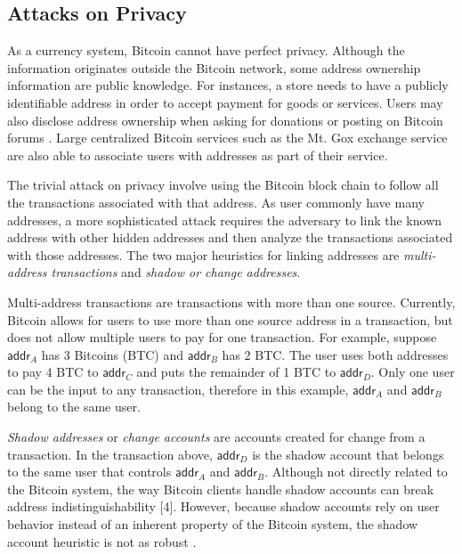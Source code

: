 \subsection{Attacks on Privacy}
As a currency system, Bitcoin cannot have perfect privacy. Although the information originates outside the Bitcoin network, some address ownership information are public knowledge. For instances, a store needs to have a publicly identifiable address in order to accept payment for goods or services.  Users may also disclose address ownership when asking for donations or posting on Bitcoin forums \cite{Fistful12}. Large centralized Bitcoin services such as the Mt. Gox exchange service are also able to associate users with addresses as part of their service.

The trivial attack on privacy involve using the Bitcoin block chain to follow all the transactions associated with that address. As user commonly have many addresses, a more sophisticated attack requires the adversary to link the known address with other hidden addresses and then analyze the transactions associated with those addresses. The two major heuristics for linking addresses are \emph{multi-address transactions} and \emph{shadow or change addresses}. 

Multi-address transactions are transactions with more than one source. Currently, Bitcoin allows for users to use more than one source address in a transaction, but does not allow multiple users to pay for one transaction. For example, suppose $\mathsf{addr}_A$ has 3 Bitcoins (BTC) and $\mathsf{addr}_B$ has 2 BTC. The user uses both addresses to pay 4 BTC to $\mathsf{addr}_C$ and puts the remainder of 1 BTC to $\mathsf{addr}_D$. Only one user can be the input to any transaction, therefore in this example, $\mathsf{addr}_A$ and $\mathsf{addr}_B$ belong to the same user.

\emph{Shadow addresses} or \emph{change accounts} are accounts created for change from a transaction. In the transaction above, $\mathsf{addr}_D$ is the shadow account that belongs to the same user that controls $\mathsf{addr}_A$ and $\mathsf{addr}_B$. Although not directly related to the Bitcoin system, the way Bitcoin clients handle shadow accounts can break address indistinguishability [4]. However, because shadow accounts rely on user behavior instead of an inherent property of the Bitcoin system, the shadow account heuristic is not as robust \cite{Fistful12}.

